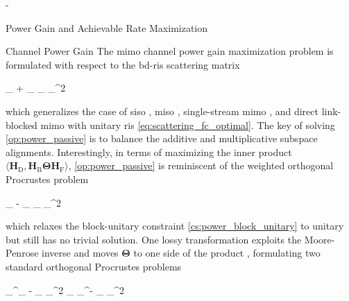 \begin{section}{-}
	\begin{subsection}{Power Gain and Achievable Rate Maximization}\label{sc:power_rate}
		\begin{subsubsection}{Channel Power Gain}\label{sc:power}
			The \gls{mimo} channel power gain maximization problem is formulated with respect to the \gls{bd}-\gls{ris} scattering matrix
			\begin{maxi!}
				{\scriptstyle{\mathbf{\Theta}}}{\lVert {}_ + _ \mathbf{\Theta} _\mathrm{F} \rVert _^2}{\label{op:power_passive}}{\label{ob:power_passive}}
			\end{maxi!}
			which generalizes the case of \gls{siso} \cite{Shen2020a}, \gls{miso} \cite{Santamaria2023,Fang2023}, single-stream \gls{mimo} \cite{Nerini2023,Nerini2023b}, and direct link-blocked \gls{mimo} with unitary \gls{ris} \eqref{eq:scattering_fc_optimal}.
			The key of solving \eqref{op:power_passive} is to balance the additive and multiplicative subspace alignments.
			Interestingly, in terms of maximizing the inner product $\langle \mathbf{H}_\mathrm{D}, \mathbf{H}_\mathrm{B} \mathbf{\Theta} \mathbf{H}_\mathrm{F} \rangle$, \eqref{op:power_passive} is reminiscent of the weighted orthogonal Procrustes problem \cite{Gower2004}
			\begin{mini!}
				{\scriptstyle{\mathbf{\Theta}}}{\lVert {}_ - _ \mathbf{\Theta} _\mathrm{F} \rVert _^2}{\label{op:weighted_orthogonal_procrustes}}{}
			\end{mini!}
			which relaxes the block-unitary constraint \eqref{cs:power_block_unitary} to unitary but still has no trivial solution.
			One lossy transformation exploits the Moore-Penrose inverse and moves $\mathbf{\Theta}$ to one side of the product \cite{Bell2003}, formulating two standard orthogonal Procrustes problems
			\begin{mini!}
				{\scriptstyle{\mathbf{\Theta}}}{\lVert {}_^\dagger {}_ - \mathbf{\Theta} _\mathrm{F} \rVert _^2  \lVert \mathbf{H}_ _^\dagger - _ \mathbf{\Theta} \rVert _^2}{\label{op:standard_orthogonal_procrustes}}{}
				\addConstraint{\mathbf{\Theta}^\mathsf{H} \mathbf{\Theta}=\mathbf{I},}{}{}
			\end{mini!}

\end{subsubsection}
\end{subsection}
\end{section}
